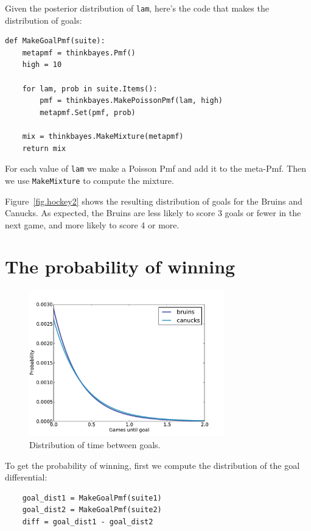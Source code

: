 \documentclass[12pt]{book}
\begin{document}
Given the posterior distribution of {\tt lam}, here's the code
that makes the distribution of goals:

\begin{verbatim}
def MakeGoalPmf(suite):
    metapmf = thinkbayes.Pmf()
    high = 10

    for lam, prob in suite.Items():
        pmf = thinkbayes.MakePoissonPmf(lam, high)
        metapmf.Set(pmf, prob)

    mix = thinkbayes.MakeMixture(metapmf)
    return mix
\end{verbatim}  

For each value of {\tt lam} we make a Poisson Pmf and add it to the
meta-Pmf.  Then we use \verb"MakeMixture" to compute the mixture.

Figure~\ref{fig.hockey2} shows the resulting distribution of goals for
the Bruins and Canucks.  As expected, the Bruins are less likely to
score 3 goals or fewer in the next game, and more likely to score 4 or
more.


\section{The probability of winning}

\begin{figure}
\centerline{\includegraphics[height=2.5in]{figs/hockey3.pdf}}
\caption{Distribution of time between goals.}
\label{fig.hockey3}
\end{figure}

To get the probability of winning, first we compute the
distribution of the goal differential:

\begin{verbatim}
    goal_dist1 = MakeGoalPmf(suite1)
    goal_dist2 = MakeGoalPmf(suite2)
    diff = goal_dist1 - goal_dist2
\end{verbatim}  
\end{document}
